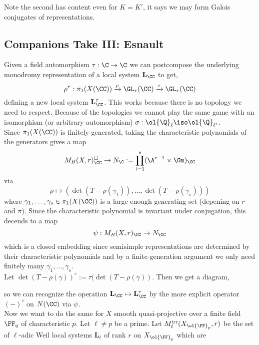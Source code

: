 \documentclass{article}
\newcommand{\Qbar}{\ol{\Q}}
\newcommand{\LL}{\mathbf{L}}
\newcommand{\irr}{\mathrm{irr}}
\begin{document}
Note the second has content even for $K = K'$, it says we may form Galois conjugates of representations.

\subsection{Companions Take III: Esnault}

Given a field automorphism $\tau : \C \to \C$ we can postcompose the underlying monodromy representation of a local system $\LL_{\CC}$ to get,
\[ \rho^\tau : \pi_1(X(\CC)) \xrightarrow{\rho} \GL_r(\CC) \xrightarrow{\tau} \GL_r(\CC) \]
defining a new local system $\LL_{\CC}^\tau$. This works because there is no topology we need to respect. Because of the topologies we cannot play the same game with an isomorphism (or arbitrary automorphism) $\sigma : \Qbar_\ell \iso \Qbar_{\ell'}$.
\bigskip\\
Since $\pi_1(X(\CC))$ is finitely generated, taking the characteristic polynomials of the generators gives a map
\[ M_B(X, r)_{\CC}^\square \to N_{\C} := \prod_{i = 1}^s (\A^{r-1} \times \Gm)_{\CC} \]
via
\[ \rho \mapsto (\det{(T - \rho(\gamma_1))}, \dots, \det{(T - \rho(\gamma_s))}) \]
where $\gamma_1, \dots, \gamma_s \in \pi_1(X(\CC))$ is a large enough generating set (depening on $r$ and $\pi$). Since the characteristic polynomial is invariant under conjugation, this decends to a map
\[ \psi : M_B(X,r)_{\CC} \to N_{\CC} \]
which is a closed embedding since semisimple representations are determined by their characteristic polynomials and by a finite-generation argument we only need finitely many $\gamma_1, \dots, \gamma_s$. 
\bigskip\\
Let $\det{(T - \rho(\gamma))}^\tau := \tau(\det{(T - \rho(\gamma))}$. Then we get a diagram,
\begin{center}
\end{center}
so we can recognize the operation $\LL_{\CC} \mapsto \LL_{\CC}^\tau$ by the more explicit operator $(-)^{\tau}$ on $N(\CC)$ via $\psi$. 
\bigskip\\
Now we want to do the same for $X$ smooth quasi-projective over a finite field $\FF_q$ of characteristic $p$. Let $\ell \neq p$ be a prime. Let $M^{\irr}_\ell(X_{\ol{\FF}_p}, r)$ be the set of $\ell$-adic Weil local systems $\LL_\ell$ of rank $r$ on $X_{\ol{\FF}_p}$ which are
\end{document}
